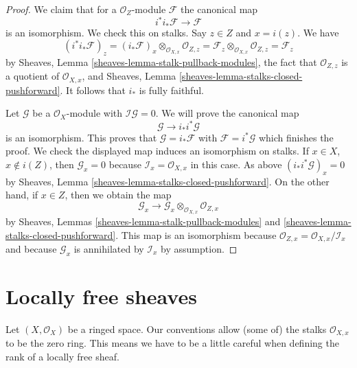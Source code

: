 \begin{proof}
We claim that for a $\mathcal{O}_Z$-module $\mathcal{F}$ the canonical map
$$
i^*i_*\mathcal{F} \longrightarrow \mathcal{F}
$$
is an isomorphism. We check this on stalks. Say $z \in Z$ and $x = i(z)$.
We have
$$
(i^*i_*\mathcal{F})_z =
(i_*\mathcal{F})_x \otimes_{\mathcal{O}_{X, x}} \mathcal{O}_{Z, z} =
\mathcal{F}_z \otimes_{\mathcal{O}_{X, x}} \mathcal{O}_{Z, z} =
\mathcal{F}_z
$$
by Sheaves, Lemma \ref{sheaves-lemma-stalk-pullback-modules},
the fact that $\mathcal{O}_{Z, z}$ is a quotient of $\mathcal{O}_{X, x}$, and
Sheaves, Lemma \ref{sheaves-lemma-stalks-closed-pushforward}.
It follows that $i_*$ is fully faithful.

\medskip\noindent
Let $\mathcal{G}$ be a $\mathcal{O}_X$-module with
$\mathcal{I}\mathcal{G} = 0$. We will prove the canonical map
$$
\mathcal{G} \longrightarrow i_*i^*\mathcal{G}
$$
is an isomorphism. This proves that $\mathcal{G} = i_*\mathcal{F}$
with $\mathcal{F} = i^*\mathcal{G}$ which finishes the proof.
We check the displayed map induces an isomorphism on stalks.
If $x \in X$, $x \not \in i(Z)$, then $\mathcal{G}_x = 0$
because $\mathcal{I}_x = \mathcal{O}_{X, x}$ in this
case. As above $(i_*i^*\mathcal{G})_x = 0$ by
Sheaves, Lemma \ref{sheaves-lemma-stalks-closed-pushforward}.
On the other hand, if $x \in Z$, then we obtain the map
$$
\mathcal{G}_x
\longrightarrow
\mathcal{G}_x \otimes_{\mathcal{O}_{X, x}} \mathcal{O}_{Z, x}
$$
by Sheaves, Lemmas \ref{sheaves-lemma-stalk-pullback-modules} and
\ref{sheaves-lemma-stalks-closed-pushforward}. This map is an isomorphism
because $\mathcal{O}_{Z, x} = \mathcal{O}_{X, x}/\mathcal{I}_x$
and because $\mathcal{G}_x$ is annihilated by $\mathcal{I}_x$ by assumption.
\end{proof}










\section{Locally free sheaves}
\label{section-locally-free}

\noindent
Let $(X, \mathcal{O}_X)$ be a ringed space.
Our conventions allow (some of) the stalks $\mathcal{O}_{X, x}$
to be the zero ring. This means we have to be a little careful
when defining the rank of a locally free sheaf.

